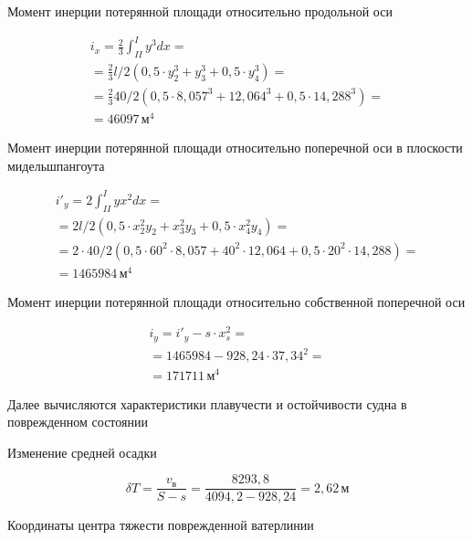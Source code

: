 Момент инерции потерянной площади относительно продольной оси

\begin{equation*}
    \begin{split}
        i_x = \frac{2}{3} \int_{II}^{I} y^3 dx = \\
        = \frac{2}{3} l/2 (0{,}5 \cdot y_2^3 + y_3^3 + 0{,}5 \cdot y_4^3) = \\
        = \frac{2}{3} 40/2 (0{,}5 \cdot 8{,}057^3 + 12{,}064^3 + 0{,}5 \cdot 14{,}288^3) = \\
        = 46097\,\text{м}^4
    \end{split}
\end{equation*}

Момент инерции потерянной площади относительно поперечной оси в плоскости мидельшпангоута

\begin{equation*}
    \begin{split}
        i'_y = 2 \int_{II}^{I} y x^2 dx = \\
        = 2 l/2 ( 0{,}5 \cdot x_2^2 y_2 + x_3^2 y_3 + 0{,}5 \cdot x_4^2 y_4) = \\
        = 2 \cdot 40/2 (0{,}5 \cdot 60^2 \cdot 8{,}057 + 40^2 \cdot 12{,}064 + 0{,}5 \cdot 20^2 \cdot 14{,}288) = \\
        = 1465984\,\text{м}^4
    \end{split}
\end{equation*}

Момент инерции потерянной площади относительно собственной поперечной оси

\begin{equation*}
    \begin{split}
        i_y = i'_y - s \cdot x_s^2 = \\
        = 1465984 -  928{,}24 \cdot 37{,}34^2 = \\
        = 171711\,\text{м}^4
    \end{split}
\end{equation*}

Далее вычисляются характеристики плавучести и остойчивости судна в поврежденном состоянии

Изменение средней осадки

\begin{equation*}
    \delta T = \frac{v_{\text{в}}}{S - s} = \frac{8293{,}8}{4094{,}2 - 928{,}24} = 2{,}62\,\text{м}
\end{equation*}

Координаты центра тяжести поврежденной ватерлинии

